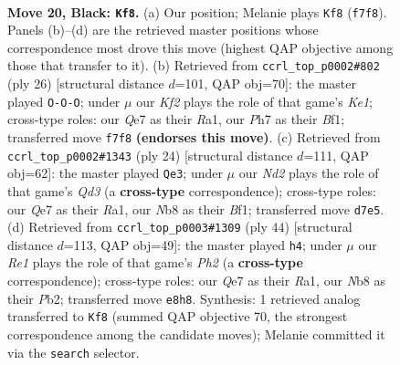 \documentclass[11pt]{article}
\begin{document}
\clearpage

\begin{figure}[p]\centering
\begin{subfigure}{0.46\textwidth}\centering
\resizebox{\linewidth}{!}{%
\newchessgame
\chessboard[
  setfen={rnb1r3/3nqk1p/pp2p1p1/2p1P3/P2p4/8/1PPQ1PPP/1KN1RBNR b - - 3 20},
  showmover=false,
  pgfstyle=straightmove, color=movearrow, markmove={f7-f8}
]}
\caption{}
\end{subfigure}\hfill
\begin{subfigure}{0.46\textwidth}\centering
\resizebox{\linewidth}{!}{%
\newchessgame
\chessboard[
  setfen={r1b1k2r/1pp1bp1p/n6q/p2P1p2/2P1pP2/2N3P1/PPQ1N2P/R3KB1R w KQkq - 0 14},
  showmover=false,
  pgfstyle=straightmove, color=movearrow, markmove={e1-c1}
]}
\caption{}
\end{subfigure}
\\[4pt]
\begin{subfigure}{0.46\textwidth}\centering
\resizebox{\linewidth}{!}{%
\newchessgame
\chessboard[
  setfen={1r2k2r/1bpnqppp/p3p3/1p5n/3PP3/P1NQ1N2/1P3PPP/R3KB1R w KQk - 0 13},
  showmover=false,
  pgfstyle=straightmove, color=movearrow, markmove={d3-e3}
]}
\caption{}
\end{subfigure}\hfill
\begin{subfigure}{0.46\textwidth}\centering
\resizebox{\linewidth}{!}{%
\newchessgame
\chessboard[
  setfen={r1bqnrk1/1p5p/p2p4/2pPpPp1/P3P1P1/2N2R2/1P2B1QP/R5K1 w - - 0 23},
  showmover=false,
  pgfstyle=straightmove, color=movearrow, markmove={h2-h4}
]}
\caption{}
\end{subfigure}
\caption{\textbf{Move 20, Black: \texttt{Kf8}.} (a) Our position; Melanie plays \texttt{Kf8} (\texttt{f7f8}). Panels (b)--(d) are the retrieved master positions whose correspondence most drove this move (highest QAP objective among those that transfer to it). (b) Retrieved from \texttt{ccrl\_top\_p0002\#802} (ply 26) [structural distance $d$=101, QAP obj=70]: the master played \texttt{O-O-O}; under $\mu$ our \emph{Kf2} plays the role of that game's \emph{Ke1}; cross-type roles: our \emph{Q}e7 as their \emph{R}a1, our \emph{P}h7 as their \emph{B}f1; transferred move \texttt{f7f8} \textbf{(endorses this move)}. (c) Retrieved from \texttt{ccrl\_top\_p0002\#1343} (ply 24) [structural distance $d$=111, QAP obj=62]: the master played \texttt{Qe3}; under $\mu$ our \emph{Nd2} plays the role of that game's \emph{Qd3} (a \textbf{cross-type} correspondence); cross-type roles: our \emph{Q}e7 as their \emph{R}a1, our \emph{N}b8 as their \emph{B}f1; transferred move \texttt{d7e5}. (d) Retrieved from \texttt{ccrl\_top\_p0003\#1309} (ply 44) [structural distance $d$=113, QAP obj=49]: the master played \texttt{h4}; under $\mu$ our \emph{Re1} plays the role of that game's \emph{Ph2} (a \textbf{cross-type} correspondence); cross-type roles: our \emph{Q}e7 as their \emph{R}a1, our \emph{N}b8 as their \emph{P}b2; transferred move \texttt{e8h8}. Synthesis: 1 retrieved analog transferred to \texttt{Kf8} (summed QAP objective 70, the strongest correspondence among the candidate moves); Melanie committed it via the \texttt{search} selector.}
\label{fig:thought-m39}
\end{figure}
\end{document}
